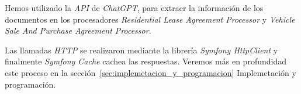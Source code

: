 Hemos utilizado la \textit{API} de \textit{ChatGPT}, para extraer la información de los documentos en los procesadores
\textit{Residential Lease Agreement Processor} y \textit{Vehicle Sale And Purchase Agreement Processor}.

Las llamadas \textit{HTTP} se realizaron mediante la librería \textit{Symfony HttpClient} y finalmente
\textit{Symfony Cache} cachea las respuestas.
Veremos más en profundidad este proceso en la sección~\ref{sec:implemetacion_y_programacion} Implemetación y
programación.



